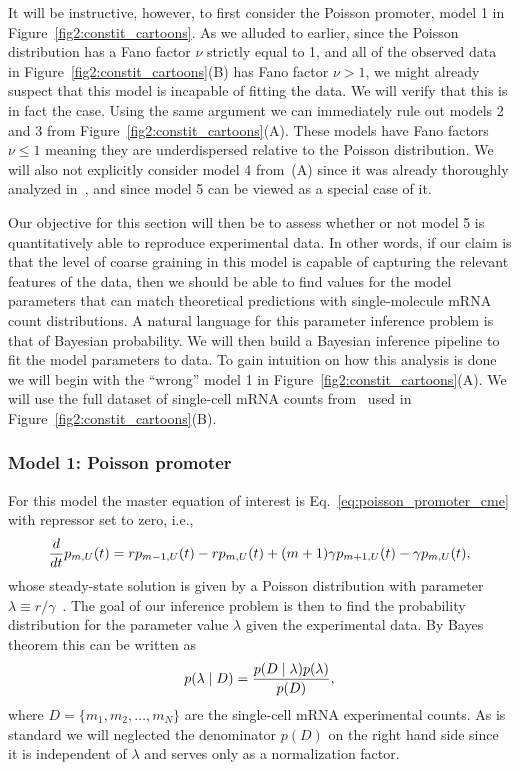 It will be instructive, however, to first consider the Poisson promoter, model 1
in Figure~\ref{fig2:constit_cartoons}. As we alluded to earlier, since the
Poisson distribution has a Fano factor $\nu$ strictly equal to 1, and all of the
observed data in Figure~\ref{fig2:constit_cartoons}(B) has Fano factor $\nu>1$,
we might already suspect that this model is incapable of fitting the data. We
will verify that this is in fact the case. Using the same argument we can
immediately rule out models 2 and 3 from Figure~\ref{fig2:constit_cartoons}(A).
These models have Fano factors $\nu\le 1$ meaning they are underdispersed
relative to the Poisson distribution. We will also not explicitly consider model
4 from~(A) since it was already thoroughly analyzed
in~\cite{Razo-Mejia2020}, and since model 5 can be viewed as a special case of
it.

Our objective for this section will then be to assess whether or not model 5 is
quantitatively able to reproduce experimental data. In other words, if our claim
is that the level of coarse graining in this model is capable of capturing the
relevant features of the data, then we should be able to find values for the
model parameters that can match theoretical predictions with single-molecule
mRNA count distributions. A natural language for this parameter inference
problem is that of Bayesian probability. We will then build a Bayesian inference
pipeline to fit the model parameters to data. To gain intuition on how this
analysis is done we will begin with the ``wrong'' model 1 in
Figure~\ref{fig2:constit_cartoons}(A). We will use the full dataset of
single-cell mRNA counts from~\cite{Jones2014} used in
Figure~\ref{fig2:constit_cartoons}(B).

\subsubsection{Model 1: Poisson promoter}

For this model the master equation of interest is
Eq.~\ref{eq:poisson_promoter_cme} with repressor set to zero, i.e.,
\begin{equation}
{d\over dt}p_{m,U}(t) = 
        rp_{m-1,U}(t) 
        - rp_{m,U}(t)
        + (m+1)\gamma p_{m+1,U}(t) 
        - \gamma p_{m,U}(t),
\end{equation}
whose steady-state solution is given by a Poisson distribution with parameter
$\lambda \equiv r / \gamma$~\cite{Sanchez2013}. The goal of our inference 
problem is then to find the probability distribution for the parameter value
$\lambda$ given the experimental data. By Bayes theorem this can be written as
\begin{equation}
p(\lambda \mid D) = {p(D \mid \lambda) p(\lambda) \over p(D)},
\end{equation}
where $D = \{m_1, m_2, \ldots, m_N \}$ are the single-cell mRNA experimental
counts. As is standard we will neglected the denominator $p(D)$ on the right
hand side since it is independent of $\lambda$ and serves only as a
normalization factor.

